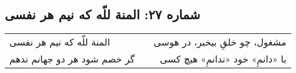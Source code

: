 \begin{center}
\section*{شماره ۲۷: المنة للّه که نیم هر نفسی}
\label{sec:027}
\begin{longtable}{l p{0.5cm} r}
المنة للّه که نیم هر نفسی
&&
مشغول، چو خلقِ بیخبر، در هوسی
\\
گر خصم شود هر دو جهانم ندهم
&&
با «دانمِ» خود «ندانمِ» هیچ کسی
\\
\end{longtable}
\end{center}
